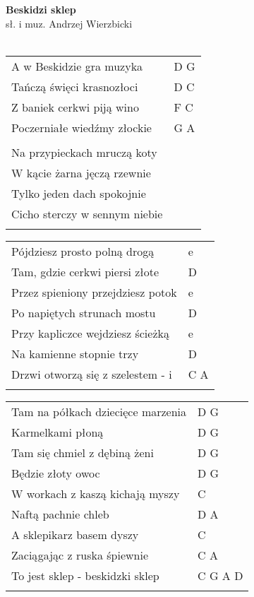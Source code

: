 \documentclass[a5paper]{article}
\begin{document}


\noindent
\fontsize{12pt}{15pt}\selectfont
\textbf{Beskidzi sklep} \\
\fontsize{8pt}{10pt}\selectfont
sł. i muz. Andrzej Wierzbicki \\ \\
\fontsize{10pt}{12pt}\selectfont
{}
\begin{tabular}{@{}p{8.5cm}p{3cm}@{}}
A w Beskidzie gra muzyka & D G \\
Tańczą święci krasnozłoci & D C \\
Z baniek cerkwi piją wino & F C \\
Poczerniałe wiedźmy złockie & G A \\ \\
 
Na przypieckach mruczą koty \\
W kącie żarna jęczą rzewnie \\
Tylko jeden dach spokojnie \\
Cicho sterczy w sennym niebie \\ \\
\end{tabular}

\noindent
\begin{tabular}{@{}p{7.5cm}p{3cm}@{}} 
Pójdziesz prosto polną drogą & e \\
Tam, gdzie cerkwi piersi złote & D \\
Przez spieniony przejdziesz potok & e \\
Po napiętych strunach mostu & D \\
Przy kapliczce wejdziesz ścieżką & e \\
Na kamienne stopnie trzy & D \\
Drzwi otworzą się z szelestem - i & C A \\ \\
\end{tabular}

\noindent
\begin{tabular}{@{}p{6.5cm}p{3cm}@{}}
Tam na półkach dziecięce marzenia & D G \\
Karmelkami płoną & D G \\
Tam się chmiel z dębiną żeni & D G \\
Będzie złoty owoc & D G \\
W workach z kaszą kichają myszy & C \\
Naftą pachnie chleb & D A \\
A sklepikarz basem dyszy & C \\
Zaciągając z ruska śpiewnie & C A \\
To jest sklep - beskidzki sklep & C G A D \\ \\
\end{tabular}
\end{document}
